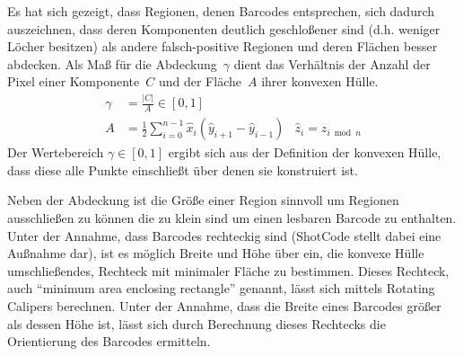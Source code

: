 \begin{enumerate}[(1)]
Es hat sich gezeigt, dass Regionen, denen Barcodes entsprechen, sich dadurch auszeichnen, dass deren Komponenten deutlich geschloßener sind (d.h. weniger Löcher besitzen) als andere falsch-positive Regionen und deren Flächen besser abdecken.
Als Maß für die Abdeckung~$\gamma$ dient das Verhältnis der Anzahl der Pixel einer Komponente~$C$ und der Fläche~$A$ \cite{braden1986} ihrer konvexen Hülle.
\begin{align}
  \gamma &= \frac{|C|}{A} \in [0,1] \\
       A &= \frac{1}{2} \sum_{i=0}^{n-1}{\hat x_i (\hat y_{i+1} - \hat y_{i-1})}
         & \hat z_i = z_{i \bmod n}
\end{align}
Der Wertebereich $\gamma\in[0,1]$ ergibt sich aus der Definition der konvexen Hülle, dass diese alle Punkte einschließt über denen sie konstruiert ist.

Neben der Abdeckung ist die Größe einer Region sinnvoll um Regionen ausschließen zu können die zu klein sind um einen lesbaren Barcode zu enthalten.
Unter der Annahme, dass Barcodes rechteckig sind (ShotCode stellt dabei eine Außnahme dar), ist es möglich Breite und Höhe über ein, die konvexe Hülle umschließendes, Rechteck mit minimaler Fläche zu bestimmen.
Dieses Rechteck, auch "`minimum area enclosing rectangle"' genannt, lässt sich mittels Rotating Calipers berechnen.
Unter der Annahme, dass die Breite eines Barcodes größer als dessen Höhe ist, lässt sich durch Berechnung dieses Rechtecks die Orientierung des Barcodes ermitteln.
\end{enumerate}


